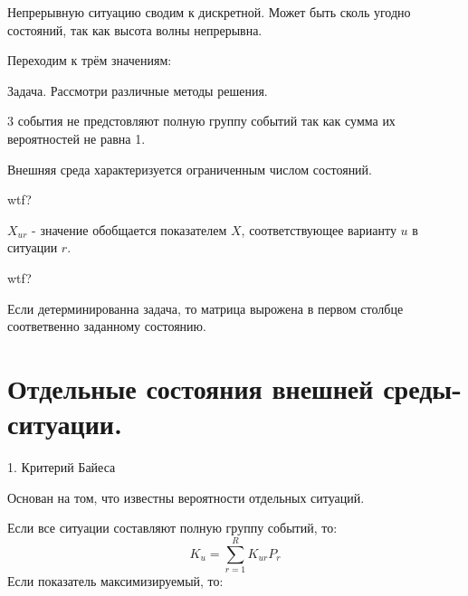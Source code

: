 \documentclass[12pt,a5paper]{scrbook}
\begin{document}
  Непрерывную ситуацию сводим к дискретной. Может быть сколь угодно состояний, так как высота волны непрерывна.

  Переходим к трём значениям:

  Задача. Рассмотри различные методы решения.

  3 события не предстовляют полную группу событий так как сумма их вероятностей не равна 1.

  Внешняя среда характеризуется ограниченным числом состояний.

  wtf?

  $X_{ur}$ - значение обобщается показателем $X$, соответствующее варианту $u$ в ситуации $r$.

  wtf?

  Если детерминированна задача, то матрица вырожена в первом столбце соответвенно заданному состоянию.

  \section{Отдельные состояния внешней среды-ситуации.}

  1. Критерий Байеса

  Основан на том, что известны вероятности отдельных ситуаций.

  Если все ситуации составляют полную группу событий, то:
  $$K_u = \sum_{r=1}^RK_{ur}P_r$$
  Если показатель максимизируемый, то:

\end{document}
